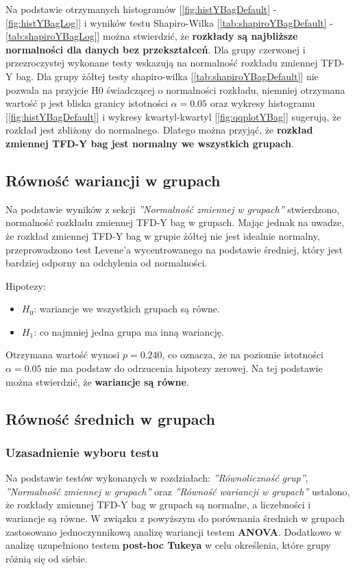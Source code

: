     Na podstawie otrzymanych histogramów [\ref{fig:histYBagDefault} - \ref{fig:histYBagLog}] i wyników testu Shapiro-Wilka 
    [\ref{tab:shapiroYBagDefault} - \ref{tab:shapiroYBagLog}] można stwierdzić, że \textbf{rozkłady są  najbliższe normalności dla danych bez przekształceń}.
    Dla grupy czerwonej i przezroczystej wykonane testy wskazują na normalność rozkładu zmiennej TFD-Y bag.
    Dla grupy żółtej testy shapiro-wilka [\ref{tab:shapiroYBagDefault}] nie pozwala na przyjcie H0 świadczącej o normalności rozkładu,
    niemniej otrzymana wartość p jest bliska granicy istotności $\alpha=0.05$ oraz wykresy histogramu [\ref{fig:histYBagDefault}] i wykresy
    kwartyl-kwartyl [\ref{fig:qqplotYBag}] sugerują, że rozkład jest zbliżony do normalnego.
    Dlatego można przyjąć, że \textbf{rozkład zmiennej TFD-Y bag jest normalny we wszystkich grupach}. 

    \subsection{Równość wariancji w grupach}
        Na podstawie wyników z sekcji \textit{''Normalność zmiennej w grupach''} stwierdzono, 
        normalność rozkładu zmiennej TFD-Y bag w grupach. Mając jednak na uwadze, że rozkład
        zmiennej TFD-Y bag w grupie żółtej nie jest idealnie normalny, przeprowadzono test Levene'a
        wycentrowanego na podstawie średniej, który jest bardziej odporny na odchylenia od normalności.

        Hipotezy:
        \begin{itemize}
            \item $H_0$: wariancje we wszystkich grupach są równe.
            \item $H_1$:  co najmniej jedna grupa ma inną wariancję.
        \end{itemize}
        Otrzymana wartość wynosi $p=0.240$, co oznacza, że na poziomie istotności $\alpha=0.05$
        nie ma podstaw do odrzucenia hipotezy zerowej. Na tej podstawie można stwierdzić, że \textbf{wariancje są równe}.

    \subsection{Równość średnich w grupach}
        \subsubsection{Uzasadnienie wyboru testu}
        Na podstawie testów wykonanych w rozdziałach: \textit{''Równoliczność grup''}, 
        \textit{''Normalność zmiennej w grupach''} oraz \textit{''Równość wariancji w grupach''} ustalono, że rozkłady zmiennej TFD-Y bag
        w grupach są normalne, a liczebności i wariancje są równe. W związku z powyższym do porównania średnich
        w grupach zastosowano jednoczynnikową analizę wariancji testem \textbf{ANOVA}. Dodatkowo w analizę uzupełniono testem \textbf{post-hoc
        Tukeya} w celu określenia, które grupy różnią się od siebie.


